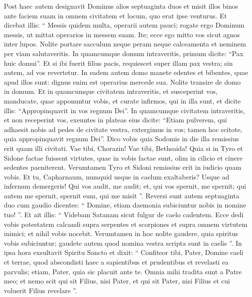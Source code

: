 \begin{biblechapter}
\begin{biblechapter}
\begin{biblechapter}
\begin{biblechapter}
\begin{biblechapter}
\begin{biblechapter}
\begin{biblechapter}
\begin{biblechapter}
\begin{biblechapter}
\begin{biblechapter}
\verse Post haec autem designavit Dominus alios septuaginta duos et misit illos binos ante faciem suam in omnem civitatem et locum, quo erat ipse venturus. 
 \verse Et dicebat illis: “ Messis quidem multa, operarii autem pauci; rogate ergo Dominum messis, ut mittat operarios in messem suam. 
\verse Ite; ecce ego mitto vos sicut agnos inter lupos. 
\verse Nolite portare sacculum neque peram neque calceamenta et neminem per viam salutaveritis. 
\verse In quamcumque domum intraveritis, primum dicite: “Pax huic domui”. 
\verse Et si ibi fuerit filius pacis, requiescet super illam pax vestra; sin autem, ad vos revertetur. 
\verse In eadem autem domo manete edentes et bibentes, quae apud illos sunt: dignus enim est operarius mercede sua. Nolite transire de domo in domum. 
\verse Et in quamcumque civitatem intraveritis, et susceperint vos, manducate, quae apponuntur vobis, 
\verse et curate infirmos, qui in illa sunt, et dicite illis: “Appropinquavit in vos regnum Dei”. 
\verse In quamcumque civitatem intraveritis, et non receperint vos, exeuntes in plateas eius dicite: 
\verse “Etiam pulverem, qui adhaesit nobis ad pedes de civitate vestra, extergimus in vos; tamen hoc scitote, quia appropinquavit regnum Dei”. 
\verse Dico vobis quia Sodomis in die illa remissius erit quam illi civitati. 
\verse Vae tibi, Chorazin! Vae tibi, Bethsaida! Quia si in Tyro et Sidone factae fuissent virtutes, quae in vobis factae sunt, olim in cilicio et cinere sedentes paeniterent. 
\verse Verumtamen Tyro et Sidoni remissius erit in iudicio quam vobis.
 \verse Et tu, Capharnaum, numquid usque in caelum exaltaberis? Usque ad infernum demergeris!
 \verse Qui vos audit, me audit; et, qui vos spernit, me spernit; qui autem me spernit, spernit eum, qui me misit ”.
 \verse Reversi sunt autem septuaginta duo cum gaudio dicentes: “ Domine, etiam daemonia subiciuntur nobis in nomine tuo! ”. 
\verse Et ait illis: “ Videbam Satanam sicut fulgur de caelo cadentem. 
\verse Ecce dedi vobis potestatem calcandi supra serpentes et scorpiones et supra omnem virtutem inimici; et nihil vobis nocebit. 
\verse Verumtamen in hoc nolite gaudere, quia spiritus vobis subiciuntur; gaudete autem quod nomina vestra scripta sunt in caelis ”.
 \verse In ipsa hora exsultavit Spiritu Sancto et dixit: “ Confiteor tibi, Pater, Domine caeli et terrae, quod abscondisti haec a sapientibus et prudentibus et revelasti ea parvulis; etiam, Pater, quia sic placuit ante te. 
\verse Omnia mihi tradita sunt a Patre meo; et nemo scit qui sit Filius, nisi Pater, et qui sit Pater, nisi Filius et cui voluerit Filius revelare ”.

\end{biblechapter}
\end{biblechapter}
\end{biblechapter}
\end{biblechapter}
\end{biblechapter}
\end{biblechapter}
\end{biblechapter}
\end{biblechapter}
\end{biblechapter}
\end{biblechapter}

